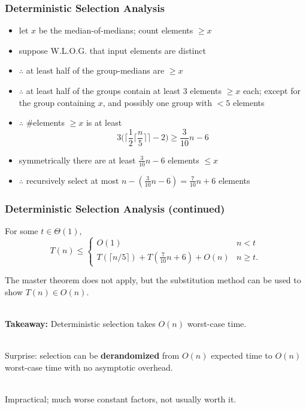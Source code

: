 \documentclass[10pt,aspectratio=169]{beamer}
\newcommand{\stanza}{ \\~\ }
\begin{document}
\begin{frame} \frametitle{Deterministic Selection Analysis}
\begin{itemize}
  \item let $x$ be the median-of-medians; count elements $\geq x$
  \item suppose W.L.O.G. that input elements are distinct
  \item $\therefore$ at least half of the group-medians are $\geq x$
  \item $\therefore$ at least half of the groups contain at least 3 elements $\geq x$ each;
    except for the group containing $x$, and possibly one group with $<5$ elements
  \item $\therefore$ \#elements $\geq x$ is at least
  \[ 3 \Big( \Big\lceil \frac{1}{2} \lceil \frac{n}{5} \rceil \Big\rceil -2 \Big)
     \geq \frac{3}{10}n - 6 \]
  \item symmetrically there are at least $\frac{3}{10}n-6$ elements $\leq x$
  \item $\therefore$ recursively select at most $n-(\frac{3}{10}n-6)=\frac{7}{10}n+6$ elements
\end{itemize}
\end{frame}

\begin{frame} \frametitle{Deterministic Selection Analysis (continued)}
For some $t \in \Theta(1),$
  \[ T(n) \leq
      \begin{cases}
        O(1) & n < t \\
        T(\lceil n/5 \rceil) + T(\frac{7}{10}n+6) + O(n) & n \geq t .
      \end{cases}
  \]

The master theorem does not apply, but the substitution method can be used to
show $T(n) \in O(n).$ \stanza

\textbf{Takeaway:} Deterministic selection takes $O(n)$ worst-case time. \stanza

Surprise: selection can be \textbf{derandomized}
from $O(n)$ expected time to $O(n)$ worst-case time with no asymptotic overhead. \stanza

Impractical; much worse constant factors, not usually worth it.
\end{frame}
\end{document}
